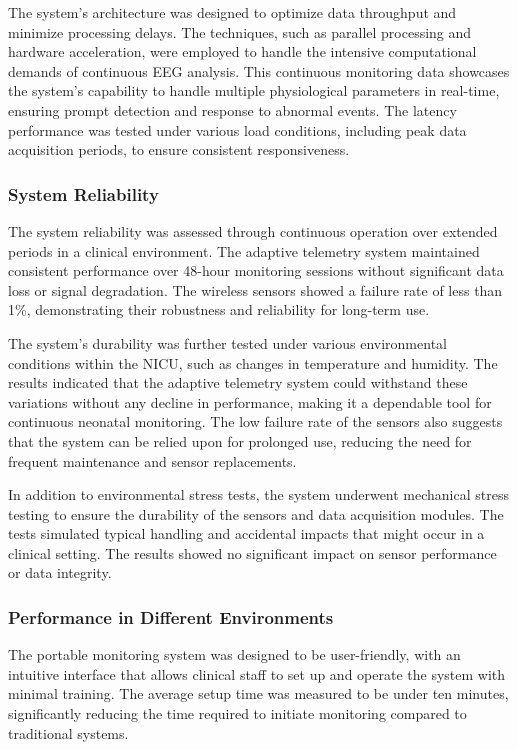 \documentclass[12pt,journal,compsoc]{IEEEtran}
\begin{document}
The system's architecture was designed to optimize data throughput and minimize processing delays. The techniques, such as parallel processing and hardware acceleration, were employed to handle the intensive computational demands of continuous EEG analysis. This continuous monitoring data showcases the system's capability to handle multiple physiological parameters in real-time, ensuring prompt detection and response to abnormal events. The latency performance was tested under various load conditions, including peak data acquisition periods, to ensure consistent responsiveness.

\subsubsection{System Reliability}

The system reliability was assessed through continuous operation over extended periods in a clinical environment. The adaptive telemetry system maintained consistent performance over 48-hour monitoring sessions without significant data loss or signal degradation. The wireless sensors showed a failure rate of less than 1\%, demonstrating their robustness and reliability for long-term use.

The system's durability was further tested under various environmental conditions within the NICU, such as changes in temperature and humidity. The results indicated that the adaptive telemetry system could withstand these variations without any decline in performance, making it a dependable tool for continuous neonatal monitoring. The low failure rate of the sensors also suggests that the system can be relied upon for prolonged use, reducing the need for frequent maintenance and sensor replacements.

In addition to environmental stress tests, the system underwent mechanical stress testing to ensure the durability of the sensors and data acquisition modules. The tests simulated typical handling and accidental impacts that might occur in a clinical setting. The results showed no significant impact on sensor performance or data integrity. 

\subsubsection{Performance in Different Environments}

The portable monitoring system was designed to be user-friendly, with an intuitive interface that allows clinical staff to set up and operate the system with minimal training. The average setup time was measured to be under ten minutes, significantly reducing the time required to initiate monitoring compared to traditional systems.   
\end{document}
